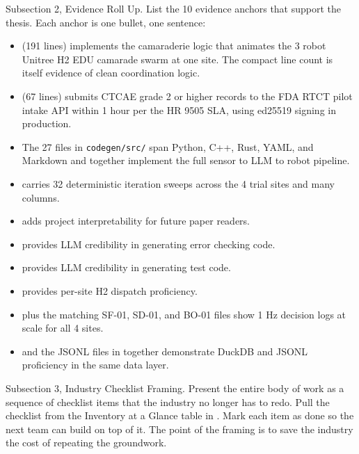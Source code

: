 \begin{sectionaccent}
Subsection 2, Evidence Roll Up. List the 10 evidence anchors that
support the thesis. Each anchor is one bullet, one sentence:
\begin{itemize}
  \item {} (191 lines)
        implements the camaraderie logic that animates the 3 robot
        Unitree H2 EDU camarade swarm at one site. The compact
        line count is itself evidence of clean coordination logic.
  \item {} (67 lines)
        submits CTCAE grade 2 or higher records to the FDA RTCT
        pilot intake API within 1 hour per the HR 9505 SLA, using
        ed25519 signing in production.
  \item The 27 files in \texttt{codegen/src/} span Python, C++,
        Rust, YAML, and Markdown and together implement the full
        sensor to LLM to robot pipeline.
  \item {} carries 32
        deterministic iteration sweeps across the 4 trial sites and
        many columns.
  \item {} adds project
        interpretability for future paper readers.
  \item {} provides LLM
        credibility in generating error checking code.
  \item {} provides LLM
        credibility in generating test code.
  \item {} provides per-site H2
        dispatch proficiency.
  \item {}
        plus the matching SF-01, SD-01, and BO-01 files show 1 Hz
        decision logs at scale for all 4 sites.
  \item {} and the
        JSONL files in  together
        demonstrate DuckDB and JSONL proficiency in the same data
        layer.
\end{itemize}

Subsection 3, Industry Checklist Framing. Present the entire body of
work as a sequence of checklist items that the industry no longer
has to redo. Pull the checklist from the Inventory at a Glance table
in
. Mark
each item as done so the next team can build on top of it. The point
of the framing is to save the industry the cost of repeating the
groundwork.


\end{sectionaccent}
